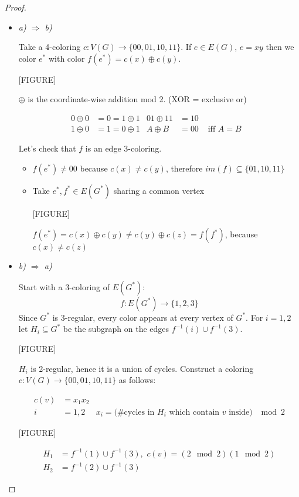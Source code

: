 \begin{proof}
\begin{itemize}
    \item \emph{a) $\Rightarrow$ b)}
    
    Take a 4-coloring $c:V(G)\rightarrow \{00,01,10,11\}$. If $e\in E(G)$, $e=xy$ then we color $e^*$ with color $f(e^*)=c(x)\oplus c(y)$.

[FIGURE]

    $\oplus$ is the coordinate-wise addition mod 2. (XOR = exclusive or)
    
\begin{align*}
     0\oplus 0 &= 0 = 1\oplus 1 & 01 \oplus 11 &= 10 & & \\
     1\oplus 0 &= 1 = 0\oplus 1 & A\oplus B &= 00 & \text{ iff } A=B
\end{align*}
    
    
    Let's check that $f$ is an edge 3-coloring.
    \begin{itemize}
        \item $f(e^*)\neq 00$ because $c(x)\neq c(y)$, therefore $im(f)	\subseteq\{01,10,11\}$
        \item Take $e^*,f^*\in E(G^*)$ sharing a common vertex

[FIGURE]

        $f(e^*)=c(x)\oplus c(y)\neq c(y)\oplus c(z)=f(f^*)$, because $c(x)\neq c(z)$
    \end{itemize}
    
    \item \emph{b) $\Rightarrow$ a)}
    
    Start with a 3-coloring of $E(G^*)$:
    $$
    f:E(G^*)\rightarrow \{1,2,3\}
    $$
    Since $G^*$ is 3-regular, every color appears at every vertex of $G^*$. For $i=1,2$ let $H_i \subseteq G^*$ be the subgraph on the edges $f^{-1}(i)\cup f^{-1}(3)$.
  
[FIGURE]

    $H_i$ is 2-regular, hence it is a union of cycles.
    Construct a coloring $c:V(G)\rightarrow \{00,01,10,11\}$ as follows:

    \begin{align*}
        c(v) & =x_1x_2 &  \\
         i & =1,2 & x_i=\text{(\# cycles in $H_i$ which contain $v$ inside) }\mod 2 
    \end{align*}
    
[FIGURE]

    \begin{align*}
            H_1 &= f^{-1}(1)\cup f^{-1}(3)\text{, }\,c(v)=(2 \mod 2)(1\mod 2) \\
            H_2 &= f^{-1}(2)\cup f^{-1}(3)   
    \end{align*}
    

\end{itemize}
\end{proof}

